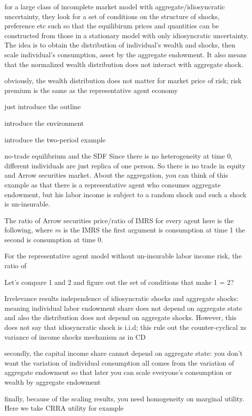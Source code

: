 \begin{frame}
for a large class of incomplete market model with aggregate/idiosyncratic uncertainty, they look for a set of conditions on the structure of shocks, preference etc such so that the equilibirum prices and quantities can be constructed from those in a stationary model with only idiosyncratic uncertainty. The idea is to obtain the distribution of individual's wealth and shocks, then scale individual's consumption, asset by the aggregate endowment. It also means that the normalized wealth distribution does not interact with aggregate shock. 

obviously, the wealth distribution does not matter for market price of risk; risk premium is the same as the representative agent economy
\end{frame}
\begin{frame}
just introduce the outline
\end{frame}
\begin{frame}
introduce the environment
\end{frame}
\begin{frame}
introduce the two-period example
\end{frame}
\begin{frame}{no-trade equilibrium and the SDF}
Since there is no heterogeneity at time 0, different individuals are just replica of one person. So there is no trade in equity and Arrow securities market. About the aggregation, you can think of this example as that there is a representative agent who consumes aggregate endowment, but his labor income is subject to a random shock and such a shock is un-insurable. 

The ratio of Arrow securities price/ratio of IMRS for every agent here is the following, where $m$ is the IMRS the first argument is consumption at time 1 the second is consumption at time 0. 

For the representative agent model without un-insurable labor income risk, the ratio of

Let's compare 1 and 2 and figure out the set of conditions that make 1 = 2?
\end{frame}
\begin{frame}{Irrelevance results}
independence of idiosyncratic shocks and aggregate shocks: meaning individual labor endowment share does not depend on aggregate state and also the distribution does not depend on aggregate shocks. However, this does not say that idiosyncratic shock is i.i.d; this rule out the counter-cyclical xs variance of income shocks mechanism as in CD

secondly, the capital income share cannot depend on aggregate state: you don't want the variation of individual consumption all comes from the variation of aggregate endowment so that later you can scale everyone's consumption or wealth by aggregate endowment

finally, because of the scaling results, you need homogeneity on marginal utility. Here we take CRRA utility for example 
\end{frame}
